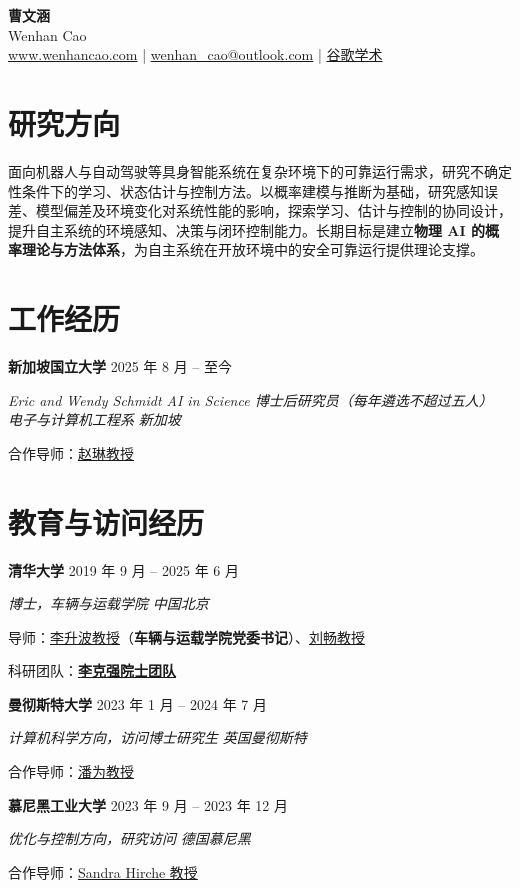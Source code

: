 \documentclass[11pt,a4paper]{article}
\newlength{\gapM}\setlength{\gapM}{6pt plus 4pt minus 2pt}  %
\newcommand{\entry}[4]{%
  \begin{samepage}%
  \textbf{#1} \hfill #2\par\nopagebreak
  {\itshape #3} \hfill {\itshape #4}\par\nopagebreak
  \end{samepage}}
\begin{document}
\begin{center}
  {\Huge\bfseries 曹文涵}\\[5pt]
  {\large Wenhan Cao}\\[6pt]
  \href{https://www.wenhancao.com}{www.wenhancao.com} \;|\;
  \href{mailto:wenhan_cao@outlook.com}{wenhan\_cao@outlook.com} \;|\;
  \href{https://scholar.google.com/citations?user=43xAy7MAAAAJ&hl=en}{谷歌学术}
\end{center}

\section{研究方向}
面向机器人与自动驾驶等具身智能系统在复杂环境下的可靠运行需求，研究不确定性条件下的学习、状态估计与控制方法。以概率建模与推断为基础，研究感知误差、模型偏差及环境变化对系统性能的影响，探索学习、估计与控制的协同设计，提升自主系统的环境感知、决策与闭环控制能力。长期目标是建立\textbf{物理 AI 的概率理论与方法体系}，为自主系统在开放环境中的安全可靠运行提供理论支撑。

\section{工作经历}
\entry{新加坡国立大学}{2025 年 8 月 -- 至今}
      {Eric and Wendy Schmidt AI in Science 博士后研究员（每年遴选不超过五人）\\电子与计算机工程系}{新加坡}
合作导师：\href{https://sites.google.com/view/lzhao}{赵琳教授}

\section{教育与访问经历}
\entry{清华大学}{2019 年 9 月 -- 2025 年 6 月}
      {博士，车辆与运载学院}{中国北京}
导师：\href{https://scholar.google.com/citations?user=Dxiw1K8AAAAJ&hl=en}{李升波教授}（\textbf{车辆与运载学院党委书记}）、\href{http://www2.coe.pku.edu.cn/faculty/liuchang/}{刘畅教授}\par
科研团队：\href{https://www.svm.tsinghua.edu.cn/essay/4/2083.html}{\textbf{李克强院士团队}}
\vspace{\gapM}

\entry{曼彻斯特大学}{2023 年 1 月 -- 2024 年 7 月}
      {计算机科学方向，访问博士研究生}{英国曼彻斯特}
合作导师：\href{https://panweihit.github.io/}{潘为教授}
\vspace{\gapM}

\entry{慕尼黑工业大学}{2023 年 9 月 -- 2023 年 12 月}
      {优化与控制方向，研究访问}{德国慕尼黑}
合作导师：\href{https://www.ce.cit.tum.de/en/itr/hirche/}{Sandra Hirche 教授}
\vspace{\gapM}
\end{document}
